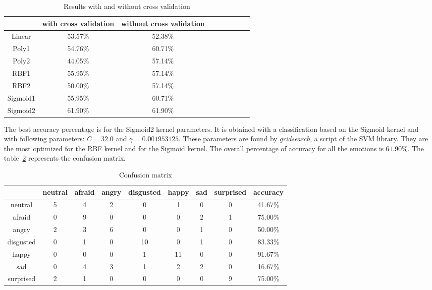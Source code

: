 \begin{table}[h]
   \caption{\label{table_results_crossvalidation} Results with and without cross validation}
\begin {center}
\begin{tabular}{|c|c|c|c|c|c|c|c|c|}
  \hline
    & with cross validation & without cross validation \\
  \hline
  Linear & 53.57\% & 52.38\% \\
  Poly1 & 54.76\% & 60.71\% \\
  Poly2 & 44.05\% & 57.14\% \\
  RBF1 & 55.95\% & 57.14\% \\
  RBF2 & 50.00\% & 57.14\% \\
  Sigmoid1 & 55.95\% & 60.71\% \\
  Sigmoid2 & 61.90\% & 61.90\% \\
  \hline
\end{tabular}
\end {center}
\end{table}

\noindent The best accuracy percentage is for the Sigmoid2 kernel parameters. It is obtained with a classification based on the Sigmoid kernel and with following parameters: $ C = 32.0 $ and $ \gamma = 0.001953125 $. These parameters are found by \textit{gridsearch}, a script of the SVM library. They are the most optimized for the RBF kernel and for the Sigmoid kernel. The overall percentage of accuracy for all the emotions is $ 61.90\% $. The table~\ref{table_results_confusion_matrix} represents the confusion matrix.
\newline

\begin{table}[h]
   \caption{\label{table_results_confusion_matrix} Confusion matrix}
\begin {center}
\begin{tabular}{|c|c|c|c|c|c|c|c|c|}
  \hline
   & neutral & afraid & angry & disgusted & happy & sad & surprised & accuracy \\
  \hline
  neutral & 5 & 4 & 2 & 0 & 1 & 0 & 0 & 41.67\% \\
  afraid & 0 & 9 & 0 & 0 & 0 & 2 & 1 & 75.00\% \\
  angry & 2 & 3 & 6 & 0 & 0 & 1 & 0 & 50.00\% \\
  disgusted & 0 & 1 & 0 & 10 & 0 & 1 & 0 & 83.33\% \\
  happy & 0 & 0 & 0 & 1 & 11 & 0 & 0 & 91.67\% \\
  sad & 0 & 4 & 3 & 1 & 2 & 2 & 0 & 16.67\% \\
  surprised & 2 & 1 & 0 & 0 & 0 & 0 & 9 & 75.00\%\\
  \hline
\end{tabular}
\end {center}
\end{table}

